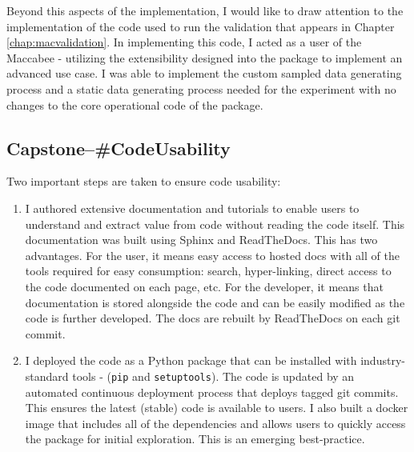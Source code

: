 \documentclass[../main.tex]{subfiles}
\begin{document}
Beyond this aspects of the implementation, I would like to draw attention to the implementation of the code used to run the validation that appears in Chapter \ref{chap:macvalidation}. In implementing this code, I acted as a user of the Maccabee - utilizing the extensibility designed into the package to implement an advanced use case. I was able to implement the custom sampled data generating process and a static data generating process needed for the experiment with no changes to the core operational code of the package.


\subsection*{\textbf{Capstone--\#CodeUsability}}
\label{lo:CodeUsability}

Two important steps are taken to ensure code usability:

\begin{enumerate}
    \item I authored extensive documentation and tutorials to enable users to understand and extract value from code without reading the code itself. This documentation was built using Sphinx and ReadTheDocs. This has two advantages. For the user, it means easy access to hosted docs with all of the tools required for easy consumption: search, hyper-linking, direct access to the code documented on each page, etc. For the developer, it means that documentation is stored alongside the code and can be easily modified as the code is further developed. The docs are rebuilt by ReadTheDocs on each git commit.
    
    \item I deployed the code as a Python package that can be installed with industry-standard tools - (\texttt{pip} and \texttt{setuptools}). The code is updated by an automated continuous deployment process that deploys tagged git commits. This ensures the latest (stable) code is available to users. I also built a docker image that includes all of the dependencies and allows users to quickly access the package for initial exploration. This is an emerging best-practice.
    
\end{enumerate}

\end{document}

